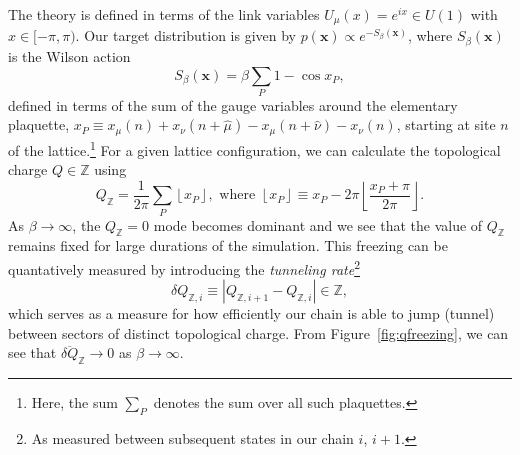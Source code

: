 \documentclass[a4paper,11pt]{article}
\newcommand{\x}{\mathbf{x}}
\begin{document}
%
The theory is defined in terms of the link variables
\(U_{\mu}(x) = e^{i x} \in U(1)\) with \(x \in [-\pi, \pi)\).
%
Our target distribution is given by \(p(\x)\propto e^{-S_{\beta}(\x)}\), where
\(S_{\beta}(\x)\) is the Wilson action
%
\begin{equation}
  S_{\beta}(\x) = \beta \sum_{P} 1 - \cos{x_{P}},
\end{equation}
%
defined in terms of the sum of the gauge variables around the elementary
plaquette, \(x_{P} \equiv x_{\mu}(n) + x_{\nu}(n + \hat{\mu}) -
x_{\mu}(n+\hat{\nu}) - x_{\nu}(n)\), starting at site \(n\) of the
lattice.\footnote{%
    Here, the sum \(\sum_{P}\) denotes the sum over all such plaquettes.
}
%
For a given lattice configuration, we can calculate the topological charge \(Q
\in \mathbb{Z}\) using
%
\begin{equation}
    Q_{\mathbb{Z}} = \frac{1}{2\pi}\sum_{P}\left\lfloor x_{P} \right\rfloor,\text{ where }
    \left\lfloor x_{P} \right\rfloor \equiv x_{P} - 2\pi
    \left\lfloor\frac{x_{P}+\pi}{2\pi}\right\rfloor.
\end{equation}
%
As \(\beta \rightarrow \infty\), the \(Q_{\mathbb{Z}} = 0\) mode becomes
dominant and we see that the value of \(Q_\mathbb{Z}\) remains fixed for large
durations of the simulation.
%
This freezing can be quantatively measured by introducing the \emph{tunneling
rate}\footnote{As measured between subsequent states in our chain \(i\),
\(i+1\).}
%
\begin{equation}
  \delta Q_{\mathbb{Z},i} \equiv \left|Q_{\mathbb{Z},i+1} - Q_{\mathbb{Z},i}\right|
    \in \mathbb{Z},
\end{equation}
%
which serves as a measure for how efficiently our chain is able to jump
(tunnel) between sectors of distinct topological charge.
%
From Figure~\ref{fig:qfreezing}, we can see that
\(\overline{\delta Q}_{\mathbb{Z}} \rightarrow 0\) as
\(\beta\rightarrow \infty\).
%
\end{document}
